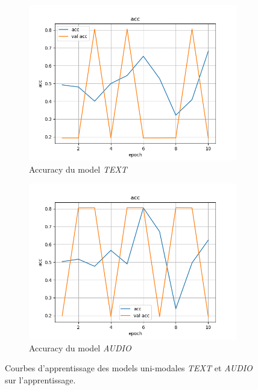\documentclass[a4paper]{article}
\begin{document}
\begin{figure}[H]
    \centering
    \begin{subfigure}{0.45\textwidth}
        \includegraphics[width=\textwidth]{../logs/text_4/acc.png}
        \caption{Accuracy du model \textit{TEXT}}
    \end{subfigure}
    \hfill
    \begin{subfigure}{0.45\textwidth}
        \includegraphics[width=\textwidth]{../logs/audio_2/acc.png}
        \caption{Accuracy du model \textit{AUDIO}}
    \end{subfigure}
    \caption{Courbes d'apprentissage des models uni-modales \textit{TEXT} et \textit{AUDIO} sur l'apprentissage.}
    \label{fig: train unimodale}
\end{figure}
\end{document}
